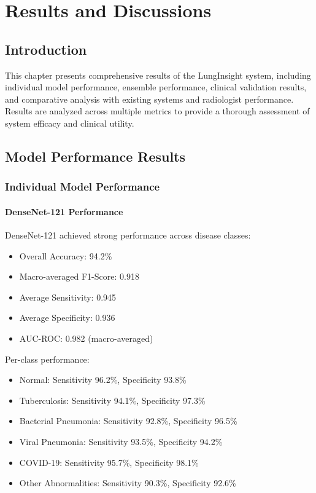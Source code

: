 \chapter{Results and Discussions}\thispagestyle{empty}
\graphicspath{{Chapter5/}}
{

\section{Introduction}

This chapter presents comprehensive results of the LungInsight system, including individual model performance, ensemble performance, clinical validation results, and comparative analysis with existing systems and radiologist performance. Results are analyzed across multiple metrics to provide a thorough assessment of system efficacy and clinical utility.

\section{Model Performance Results}

\subsection{Individual Model Performance}

\subsubsection{DenseNet-121 Performance}

DenseNet-121 achieved strong performance across disease classes:

\begin{itemize}
    \item Overall Accuracy: 94.2\%
    \item Macro-averaged F1-Score: 0.918
    \item Average Sensitivity: 0.945
    \item Average Specificity: 0.936
    \item AUC-ROC: 0.982 (macro-averaged)
\end{itemize}

Per-class performance:
\begin{itemize}
    \item Normal: Sensitivity 96.2\%, Specificity 93.8\%
    \item Tuberculosis: Sensitivity 94.1\%, Specificity 97.3\%
    \item Bacterial Pneumonia: Sensitivity 92.8\%, Specificity 96.5\%
    \item Viral Pneumonia: Sensitivity 93.5\%, Specificity 94.2\%
    \item COVID-19: Sensitivity 95.7\%, Specificity 98.1\%
    \item Other Abnormalities: Sensitivity 90.3\%, Specificity 92.6\%
\end{itemize}

}
